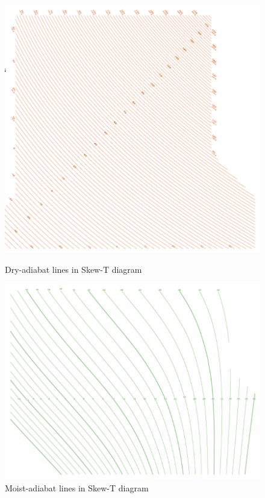\documentclass[fleqn,10pt]{SelfArx} %
\begin{document}
\begin{figure}[ht]
    \centering
    \begin{minipage}[b]{0.48\textwidth}
        \centering
        \includegraphics[width=\textwidth]{Figures/Dry-adiabat-lines.png}
        \caption{Dry-adiabat lines in Skew-T diagram}
    \end{minipage}
    \hfill
    \begin{minipage}[b]{0.48\textwidth}
        \centering
        \includegraphics[width=\textwidth]{Figures/Moist-adiabat-lines.png}
        \caption{Moist-adiabat lines in Skew-T diagram}
    \end{minipage}
\end{figure}
\end{document}
